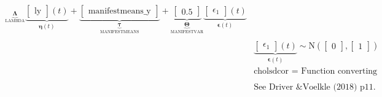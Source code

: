 \documentclass[a4paper,landscape]{report}
\newcommand{\vect}[1]{\boldsymbol{\mathbf{#1}}}
\begin{document}
\begin{footnotesize}
\begin{align*}
{        }_{\underbrace{\vect{\Lambda}}_\textrm{LAMBDA}} \underbrace{
          \begin{bmatrix}
\text{ly}
\end{bmatrix} 
          (t)}_{\vect{\eta}(t)} +
        \underbrace{
          \begin{bmatrix}
\text{manifestmeans\_y}
\end{bmatrix} 
        }_{\underbrace{\vect{\tau}}_\textrm{MANIFESTMEANS}} + 
              \underbrace{
                \begin{bmatrix}
0.5
\end{bmatrix}  
              }_{\underbrace{\vect{\Theta}}_\textrm{MANIFESTVAR}}
              \underbrace{
          \begin{bmatrix}
\epsilon_{1}
\end{bmatrix} 
          (t)}_{\vect{\epsilon}(t)} \\ \\
          &\underbrace{
            \begin{bmatrix}
\epsilon_{1}
\end{bmatrix} 
            (t)}_{\vect{\epsilon}(t)} \sim  \mathrm{N} \left(
              \begin{bmatrix}
0
\end{bmatrix}
              ,
                \begin{bmatrix}
1
\end{bmatrix} \right) \\
&\textrm{cholsdcor = Function converting lower tri matrix of std dev and unconstrained correlation to Cholesky factor.} \\ \\ 
&\textrm{See Driver \& Voelkle (2018) p11.}
      \end{align*}
      \end{footnotesize}
      
\end{document}
